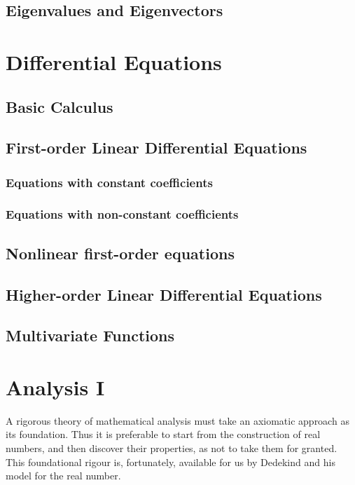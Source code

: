 \documentclass[12pt]{book}
\theoremstyle{definition}
\theoremstyle{remark}
\begin{document}
			\section{Eigenvalues and Eigenvectors}
				
	\chapter{Differential Equations}
		\section{Basic Calculus}
		
		\section[1st-order LDEs]{First-order Linear Differential Equations}
			\subsection{Equations with constant coefficients}
				
			\subsection{Equations with non-constant coefficients}
			
		\section{Nonlinear first-order equations}
		
		\section[Higher-order LDEs]{Higher-order Linear Differential Equations}
		
		\section{Multivariate Functions}
	
	\chapter{Analysis I}
		A rigorous theory of mathematical analysis must take an axiomatic approach as its foundation. Thus it is preferable to start from the construction of real numbers, and then discover their properties, as not to take them for granted. This foundational rigour is, fortunately, available for us by Dedekind and his model for the real number.
		
\end{document}
